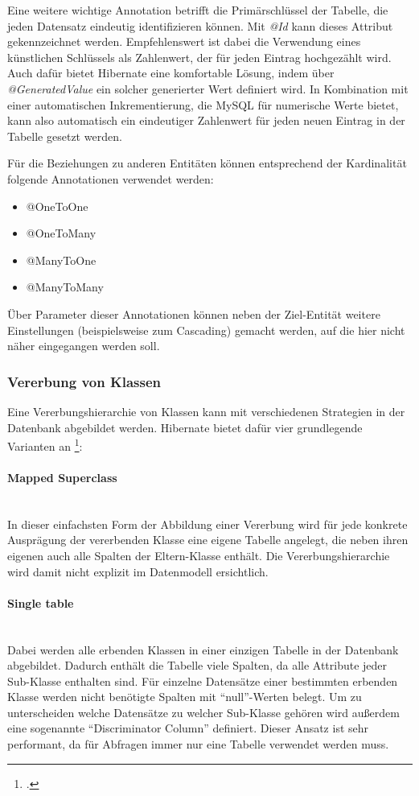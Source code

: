Eine weitere wichtige Annotation betrifft die Primärschlüssel der Tabelle, die jeden Datensatz eindeutig identifizieren können. Mit \textit{@Id} kann dieses Attribut gekennzeichnet werden.
Empfehlenswert ist dabei die Verwendung eines künstlichen Schlüssels als Zahlenwert, der für jeden Eintrag hochgezählt wird.
Auch dafür bietet Hibernate eine komfortable Lösung, indem über \textit{@GeneratedValue} ein solcher generierter Wert definiert wird.
In Kombination mit einer automatischen Inkrementierung, die MySQL für numerische Werte bietet, kann also automatisch ein eindeutiger Zahlenwert für jeden neuen Eintrag in der Tabelle gesetzt werden.

Für die Beziehungen zu anderen Entitäten können entsprechend der Kardinalität folgende Annotationen verwendet werden:
\begin{itemize}
\item{@OneToOne}
\item{@OneToMany}
\item{@ManyToOne}
\item{@ManyToMany}
\end{itemize}

Über Parameter dieser Annotationen können neben der Ziel-Entität weitere Einstellungen (beispielsweise zum Cascading) gemacht werden, auf die hier nicht näher eingegangen werden soll.

\subsubsection{Vererbung von Klassen}
Eine Vererbungshierarchie von Klassen kann mit verschiedenen Strategien in der Datenbank abgebildet werden.
Hibernate bietet dafür vier grundlegende Varianten an \footcite[Vgl.][]{Mihalcea2017}:
\paragraph{Mapped Superclass}$\;$ \\
In dieser einfachsten Form der Abbildung einer Vererbung wird für jede konkrete Ausprägung der vererbenden Klasse eine eigene Tabelle angelegt, die neben ihren eigenen auch alle Spalten der Eltern-Klasse enthält.
Die Vererbungshierarchie wird damit nicht explizit im Datenmodell ersichtlich.
\paragraph{Single table}$\;$ \\
Dabei werden alle erbenden Klassen in einer einzigen Tabelle in der Datenbank abgebildet. Dadurch enthält die Tabelle viele Spalten, da alle Attribute jeder Sub-Klasse enthalten sind.
Für einzelne Datensätze einer bestimmten erbenden Klasse werden nicht benötigte Spalten mit \enquote{null}-Werten belegt.
Um zu unterscheiden welche Datensätze zu welcher Sub-Klasse gehören wird außerdem eine sogenannte \enquote{Discriminator Column} definiert.
Dieser Ansatz ist sehr performant, da für Abfragen immer nur eine Tabelle verwendet werden muss.
